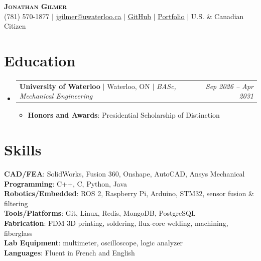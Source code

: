 \documentclass[letterpaper,11pt]{article}
\makeatletter
\newcommand{\resumeItem}[1]{
  \item\small{
    {#1 \vspace{-2pt}}
  }
}
\newcommand{\resumeSubheading}[4]{
  \vspace{-2pt}\item
    \begin{tabular*}{0.97\textwidth}[t]{l@{\extracolsep{\fill}}r}
      \textbf{#1} $|$ #2 $|$ \textit{#3} & \textit{\small #4} \\
    \end{tabular*}\vspace{-7pt}
}
\newcommand{\resumeSubHeadingListStart}{\begin{itemize}[leftmargin=0.15in, label={}]}
\newcommand{\resumeSubHeadingListEnd}{\end{itemize}}
\newcommand{\resumeItemListStart}{\begin{itemize}}
\newcommand{\resumeItemListEnd}{\end{itemize}\vspace{-5pt}}
\makeatother
\begin{document}

\begin{center}
    \textbf{\Huge \scshape Jonathan Gilmer} \\ \vspace{1pt}
    \small(781) 570-1877 $|$
    \href{mailto:jgilmer@uwaterloo.ca}{\uline{jgilmer@uwaterloo.ca}} $|$
    \href{https://github.com/Jonnogilm}{\uline{GitHub}} $|$
    \href{https://drive.google.com/file/d/1rFq5eKug-X8dI4mRi-UmunpJV-XK28H5/view?usp=sharing}{\uline{Portfolio}} $|$
    \small{U.S. \& Canadian Citizen}
    
\end{center}


\section{Education}
  \resumeSubHeadingListStart

    \resumeSubheading
      {University of Waterloo}
      {Waterloo, ON}
      {BASc, Mechanical Engineering}
      {Sep 2026 -- Apr 2031}
      \resumeItemListStart
        \resumeItem{\textbf{Honors and Awards}: Presidential Scholarship of Distinction}
      \resumeItemListEnd
  \resumeSubHeadingListEnd

\section{Skills}
 \begin{itemize}[leftmargin=0.15in, label={}]
    \small{\item{
     \textbf{CAD/FEA}{: SolidWorks, Fusion 360, Onshape, AutoCAD, Ansys Mechanical} \\
     \textbf{Programming}{: C++, C, Python, Java} \\
     \textbf{Robotics/Embedded}{: ROS 2, Raspberry Pi, Arduino, STM32, sensor fusion \& filtering} \\
     \textbf{Tools/Platforms}{: Git, Linux, Redis, MongoDB, PostgreSQL} \\
     \textbf{Fabrication}{: FDM 3D printing, soldering, flux-core welding, machining, fiberglass}\\
     \textbf{Lab Equipment}{: multimeter, oscilloscope, logic analyzer}\\
     \textbf{Languages}{: Fluent in French and English}
    }}
 \end{itemize}
\end{document}
